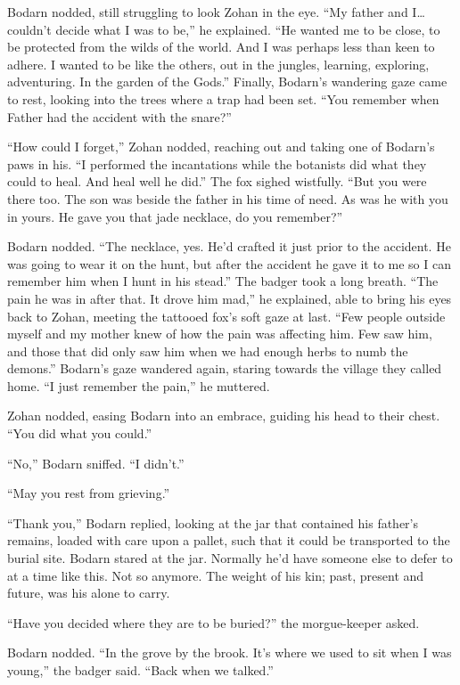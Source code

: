Bodarn nodded, still struggling to look Zohan in the eye. ``My father and I\ldots{}couldn't decide what I was to be,'' he explained. ``He wanted me to be close, to be protected from the wilds of the world. And I was perhaps less than keen to adhere. I wanted to be like the others, out in the jungles, learning, exploring, adventuring. In the garden of the Gods.'' Finally, Bodarn's wandering gaze came to rest, looking into the trees where a trap had been set. ``You remember when Father had the accident with the snare?''

``How could I forget,'' Zohan nodded, reaching out and taking one of Bodarn's paws in his. ``I performed the incantations while the botanists did what they could to heal. And heal well he did.'' The fox sighed wistfully. ``But you were there too. The son was beside the father in his time of need. As was he with you in yours. He gave you that jade necklace, do you remember?''

Bodarn nodded. ``The necklace, yes. He'd crafted it just prior to the accident. He was going to wear it on the hunt, but after the accident he gave it to me so I can remember him when I hunt in his stead.'' The badger took a long breath. ``The pain he was in after that. It drove him mad,'' he explained, able to bring his eyes back to Zohan, meeting the tattooed fox's soft gaze at last. ``Few people outside myself and my mother knew of how the pain was affecting him. Few saw him, and those that did only saw him when we had enough herbs to numb the demons.'' Bodarn's gaze wandered again, staring towards the village they called home. ``I just remember the pain,'' he muttered.

Zohan nodded, easing Bodarn into an embrace, guiding his head to their chest. ``You did what you could.''

``No,'' Bodarn sniffed. ``I didn't.''

\secdiv

\noindent ``May you rest from grieving.''

``Thank you,'' Bodarn replied, looking at the jar that contained his father's remains, loaded with care upon a pallet, such that it could be transported to the burial site. Bodarn stared at the jar. Normally he'd have someone else to defer to at a time like this. Not so anymore. The weight of his kin; past, present and future, was his alone to carry.

``Have you decided where they are to be buried?'' the morgue-keeper asked.

Bodarn nodded. ``In the grove by the brook. It's where we used to sit when I was young,'' the badger said. ``Back when we talked.''

